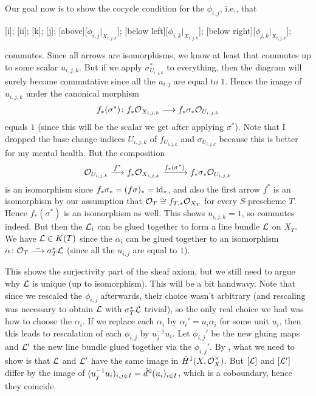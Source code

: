 \documentclass[a4paper,parskip=half,numbers=enddot, DIV=12]{scrreprt}
\begin{document}
\begin{example}
	Our goal now is to show the cocycle condition for the $\phi_{i,j}$, i.e., that
	\begin{diagram}
		[i];
		[ii];
		[k];
		[j];
		\scriptsize
		[above][$\phi_{i,j}|_{X_{i,j,k}}$];
		[below left][$\phi_{i,k}|_{X_{i,j,k}}$];
		[below right][$\phi_{j,k}|_{X_{i,j,k}}$];
	\end{diagram}
	commutes. Since all arrows are isomorphisms, we know at least that  commutes up to some scalar $u_{i,j,k}$. But if we apply $\sigma_{U_{i,j,k}}^*$ to everything, then the diagram will surely become commutative since all the $u_{i,j}$ are equal to $1$. Hence the image of $u_{i,j,k}$ under the canonical morphism 
	\begin{align*}
		f_*(\sigma^*)\colon f_*\Oo_{X_{i,j,k}}\morphism f_*\sigma_*\Oo_{U_{i,j,k}}
	\end{align*}
	equals $1$ (since this will be the scalar we get after applying $\sigma^*$). Note that I dropped the base change indices $U_{i,j,k}$ of $f_{U_{i,j,k}}$ and $\sigma_{U_{i,j,k}}$ because this is better for my mental health. But the composition
	\begin{align*}
		\Oo_{U_{i,j,k}}\morphism[f^*] f_*\Oo_{X_{i,j,k}}\xrightarrow{f_*(\sigma^*)} f_*\sigma_*\Oo_{U_{i,j,k}}
	\end{align*}
	is an isomorphism since $f_*\sigma_*=(f\sigma)_*=\operatorname{id}_*$, and also the first arrow $f^*$ is an isomorphism by our assumption that $\mathcal{O}_T\cong f_{T,*}\mathcal{O}_{X_T}$ for every $S$-prescheme $T$. Hence $f_*(\sigma^*)$ is an isomorphism as well. This shows $u_{i,j,k}=1$, so  commutes indeed. But then the $\mathcal{L}_i$ can be glued together to form a line bundle $\mathcal{L}$ on $X_T$. We have $\mathcal{L}\in K(T)$ since the $\alpha_i$ can be glued together to an isomorphism $\alpha\colon \Oo_T\isomorphism \sigma_T^*\Ll$ (since all the $u_{i,j}$ are equal to $1$).
	
	This shows the surjectivity part of the sheaf axiom, but we still need to argue why $\mathcal{L}$ is unique (up to isomorphism). This will be a bit handwavy. Note that since we rescaled the $\phi_{i,j}$ afterwards, their choice wasn't arbitrary (and rescaling was necessary to obtain $\mathcal{L}$ with $\sigma_T^*\mathcal{L}$ trivial), so the only real choice we had was how to choose the $\alpha_i$. If we replace each $\alpha_i$ by $\alpha_i'=u_i\alpha_i$ for some unit $u_i$, then this leads to rescalation of each $\phi_{i,j}$ by $u_j^{-1}u_i$. Let $\phi_{i,j}'$ be the new gluing maps and $\mathcal{L}'$ the new line bundle glued together via the $\phi_{i,j}'$. By \cite[Section~1.7]{alggeo2}, what we need to show is that $\mathcal{L}$ and $\mathcal{L}'$ have the same image in $\check{H}^1(X,\mathcal{O}_X^\times)$. But $[\mathcal{L}]$ and $[\mathcal{L}']$ differ by the image of $(u_j^{-1}u_i)_{i,j\in I}=\check{d}\hspace{0.06125em}^0(u_i)_{i\in I}$, which is a coboundary, hence they coincide.
	

\end{example}
\end{document}
